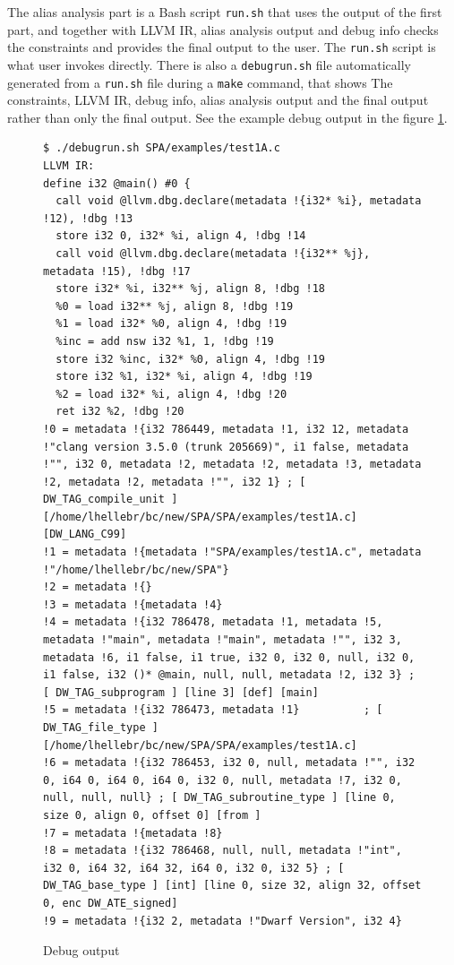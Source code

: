 The alias analysis part is a Bash script \verb|run.sh| that uses the output of the first part, and together with LLVM IR, alias analysis output and debug info checks the constraints and provides the final output to the user. The \verb|run.sh| script is what user invokes directly. There is also a \verb|debugrun.sh| file automatically generated from a \verb|run.sh| file during a \verb|make| command, that shows The constraints, LLVM IR, debug info, alias analysis output and the final output rather than only the final output. See the example debug output in the figure \ref{debug}.
\begin{figure}
\caption{Debug output}
\label{debug}
\begin{lstlisting}
$ ./debugrun.sh SPA/examples/test1A.c
LLVM IR:
define i32 @main() #0 {
  call void @llvm.dbg.declare(metadata !{i32* %i}, metadata !12), !dbg !13
  store i32 0, i32* %i, align 4, !dbg !14
  call void @llvm.dbg.declare(metadata !{i32** %j}, metadata !15), !dbg !17
  store i32* %i, i32** %j, align 8, !dbg !18
  %0 = load i32** %j, align 8, !dbg !19
  %1 = load i32* %0, align 4, !dbg !19
  %inc = add nsw i32 %1, 1, !dbg !19
  store i32 %inc, i32* %0, align 4, !dbg !19
  store i32 %1, i32* %i, align 4, !dbg !19
  %2 = load i32* %i, align 4, !dbg !20
  ret i32 %2, !dbg !20
!0 = metadata !{i32 786449, metadata !1, i32 12, metadata !"clang version 3.5.0 (trunk 205669)", i1 false, metadata !"", i32 0, metadata !2, metadata !2, metadata !3, metadata !2, metadata !2, metadata !"", i32 1} ; [ DW_TAG_compile_unit ] [/home/lhellebr/bc/new/SPA/SPA/examples/test1A.c] [DW_LANG_C99]
!1 = metadata !{metadata !"SPA/examples/test1A.c", metadata !"/home/lhellebr/bc/new/SPA"}
!2 = metadata !{}
!3 = metadata !{metadata !4}
!4 = metadata !{i32 786478, metadata !1, metadata !5, metadata !"main", metadata !"main", metadata !"", i32 3, metadata !6, i1 false, i1 true, i32 0, i32 0, null, i32 0, i1 false, i32 ()* @main, null, null, metadata !2, i32 3} ; [ DW_TAG_subprogram ] [line 3] [def] [main]
!5 = metadata !{i32 786473, metadata !1}          ; [ DW_TAG_file_type ] [/home/lhellebr/bc/new/SPA/SPA/examples/test1A.c]
!6 = metadata !{i32 786453, i32 0, null, metadata !"", i32 0, i64 0, i64 0, i64 0, i32 0, null, metadata !7, i32 0, null, null, null} ; [ DW_TAG_subroutine_type ] [line 0, size 0, align 0, offset 0] [from ]
!7 = metadata !{metadata !8}
!8 = metadata !{i32 786468, null, null, metadata !"int", i32 0, i64 32, i64 32, i64 0, i32 0, i32 5} ; [ DW_TAG_base_type ] [int] [line 0, size 32, align 32, offset 0, enc DW_ATE_signed]
!9 = metadata !{i32 2, metadata !"Dwarf Version", i32 4}

\end{lstlisting}
\end{figure}
